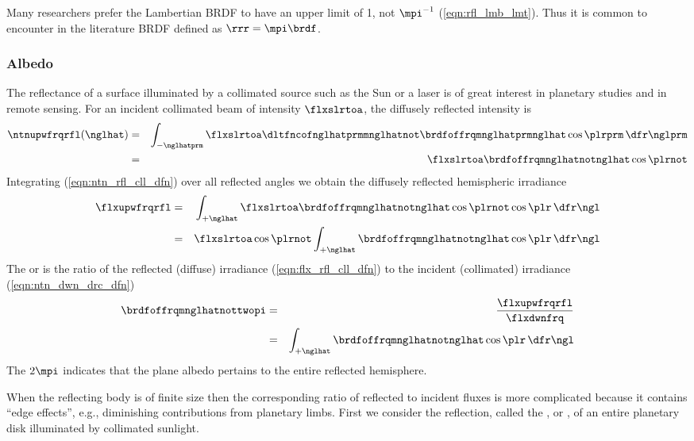 \documentclass[12pt]{article}
\begin{document}
Many researchers prefer the Lambertian BRDF to have an upper limit of
1, not $\mpi^{-1}$ (\ref{eqn:rfl_lmb_lmt}).
Thus it is common to encounter in the literature BRDF defined as
$\rrr = \mpi \brdf$.

\subsubsection[Albedo]{Albedo}\label{sxn:alb}
The reflectance of a surface illuminated by a collimated source
such as the Sun or a laser is of great interest in planetary studies
and in remote sensing.
For an incident collimated beam of intensity $\flxslrtoa$, the
diffusely reflected intensity is 
\begin{eqnarray}
\ntnupwfrqrfl(\nglhat) 
& = & 
\int_{-\nglhatprm} 
\flxslrtoa \dltfncofnglhatprmmnglhatnot 
\brdfoffrqmnglhatprmnglhat \cos \plrprm
\,\dfr\nglprm \nonumber \\
& = & 
\flxslrtoa \brdfoffrqmnglhatnotnglhat \cos \plrnot
\label{eqn:ntn_rfl_cll_dfn}
\end{eqnarray}
Integrating (\ref{eqn:ntn_rfl_cll_dfn}) over all reflected angles we 
obtain the diffusely reflected hemispheric irradiance
\begin{eqnarray}
\flxupwfrqrfl
& = & 
\int_{+\nglhat} 
\flxslrtoa \brdfoffrqmnglhatnotnglhat \cos \plrnot \cos \plr
\,\dfr\ngl \nonumber \\
& = & 
\flxslrtoa \cos \plrnot
\int_{+\nglhat} 
\brdfoffrqmnglhatnotnglhat \cos \plr \,\dfr\ngl
\label{eqn:flx_rfl_cll_dfn}
\end{eqnarray}
The  or 
is the ratio of the reflected (diffuse) irradiance
(\ref{eqn:flx_rfl_cll_dfn}) to the incident (collimated) irradiance  
(\ref{eqn:ntn_dwn_drc_dfn}) 
\begin{eqnarray}
\brdfoffrqmnglhatnottwopi
& = & \frac{\flxupwfrqrfl}{\flxdwnfrq} \nonumber \\
& = & 
\int_{+\nglhat} \brdfoffrqmnglhatnotnglhat \cos \plr \,\dfr\ngl
\label{eqn:flx_rfl_dfn}
\end{eqnarray}
The $2\mpi$ indicates that the plane albedo pertains to the entire
reflected hemisphere.

When the reflecting body is of finite size then the corresponding
ratio of reflected to incident fluxes is more complicated because it
contains ``edge effects'', e.g., diminishing contributions from
planetary limbs.
First we consider the reflection, called the ,  or , of an
entire planetary disk illuminated by collimated sunlight.
\end{document}

